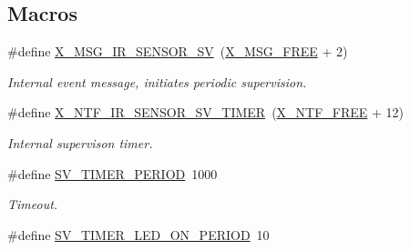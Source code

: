 \subsection*{Macros}
\begin{DoxyCompactItemize}
\item 
\#define \hyperlink{a00023_a16b09a45fdc504b8b00d634b49c820b4}{X\+\_\+\+M\+S\+G\+\_\+\+I\+R\+\_\+\+S\+E\+N\+S\+O\+R\+\_\+\+S\+V}~(\hyperlink{a00036_a082eb6e82ded25b00f04da4f611c961e}{X\+\_\+\+M\+S\+G\+\_\+\+F\+R\+E\+E} + 2)
\begin{DoxyCompactList}\small\item\em Internal event message, initiates periodic supervision. \end{DoxyCompactList}\item 
\#define \hyperlink{a00023_a3b0f15b601361fafa871c5e49df7842d}{X\+\_\+\+N\+T\+F\+\_\+\+I\+R\+\_\+\+S\+E\+N\+S\+O\+R\+\_\+\+S\+V\+\_\+\+T\+I\+M\+E\+R}~(\hyperlink{a00036_ab2eeea4643823a0c7c7731ddb83e3edc}{X\+\_\+\+N\+T\+F\+\_\+\+F\+R\+E\+E} + 12)
\begin{DoxyCompactList}\small\item\em Internal supervison timer. \end{DoxyCompactList}\item 
\#define \hyperlink{a00023_a8a535456285f4602701c814d7b69cc68}{S\+V\+\_\+\+T\+I\+M\+E\+R\+\_\+\+P\+E\+R\+I\+O\+D}~1000
\begin{DoxyCompactList}\small\item\em Timeout. \end{DoxyCompactList}\item 
\#define \hyperlink{a00023_a44e4917fdf9d2a3574a3dd34537d97a7}{S\+V\+\_\+\+T\+I\+M\+E\+R\+\_\+\+L\+E\+D\+\_\+\+O\+N\+\_\+\+P\+E\+R\+I\+O\+D}~10
\end{DoxyCompactItemize}
